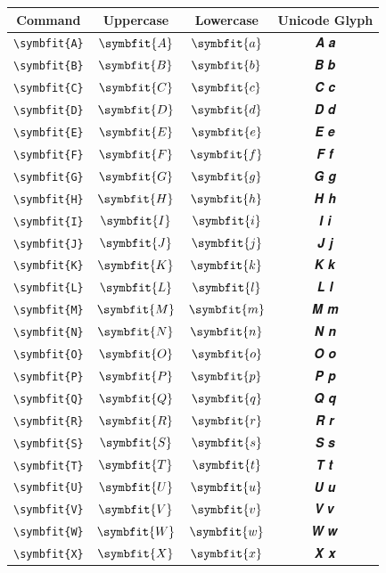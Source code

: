 \documentclass[12pt,a4paper]{article}
\begin{document}
\begin{longtable}{|c|c|c|c|}
\hline
\textbf{Command} & \textbf{Uppercase} & \textbf{Lowercase} & \textbf{Unicode Glyph} \\
\hline
\verb|\symbfit{A}| & $\symbfit{A}$ & $\symbfit{a}$ & 𝑨 𝒂 \\
\verb|\symbfit{B}| & $\symbfit{B}$ & $\symbfit{b}$ & 𝑩 𝒃 \\
\verb|\symbfit{C}| & $\symbfit{C}$ & $\symbfit{c}$ & 𝑪 𝒄 \\
\verb|\symbfit{D}| & $\symbfit{D}$ & $\symbfit{d}$ & 𝑫 𝒅 \\
\verb|\symbfit{E}| & $\symbfit{E}$ & $\symbfit{e}$ & 𝑬 𝒆 \\
\verb|\symbfit{F}| & $\symbfit{F}$ & $\symbfit{f}$ & 𝑭 𝒇 \\
\verb|\symbfit{G}| & $\symbfit{G}$ & $\symbfit{g}$ & 𝑮 𝒈 \\
\verb|\symbfit{H}| & $\symbfit{H}$ & $\symbfit{h}$ & 𝑯 𝒉 \\
\verb|\symbfit{I}| & $\symbfit{I}$ & $\symbfit{i}$ & 𝑰 𝒊 \\
\verb|\symbfit{J}| & $\symbfit{J}$ & $\symbfit{j}$ & 𝑱 𝒋 \\
\verb|\symbfit{K}| & $\symbfit{K}$ & $\symbfit{k}$ & 𝑲 𝒌 \\
\verb|\symbfit{L}| & $\symbfit{L}$ & $\symbfit{l}$ & 𝑳 𝒍 \\
\verb|\symbfit{M}| & $\symbfit{M}$ & $\symbfit{m}$ & 𝑴 𝒎 \\
\verb|\symbfit{N}| & $\symbfit{N}$ & $\symbfit{n}$ & 𝑵 𝒏 \\
\verb|\symbfit{O}| & $\symbfit{O}$ & $\symbfit{o}$ & 𝑶 𝒐 \\
\verb|\symbfit{P}| & $\symbfit{P}$ & $\symbfit{p}$ & 𝑷 𝒑 \\
\verb|\symbfit{Q}| & $\symbfit{Q}$ & $\symbfit{q}$ & 𝑸 𝒒 \\
\verb|\symbfit{R}| & $\symbfit{R}$ & $\symbfit{r}$ & 𝑹 𝒓 \\
\verb|\symbfit{S}| & $\symbfit{S}$ & $\symbfit{s}$ & 𝑺 𝒔 \\
\verb|\symbfit{T}| & $\symbfit{T}$ & $\symbfit{t}$ & 𝑻 𝒕 \\
\verb|\symbfit{U}| & $\symbfit{U}$ & $\symbfit{u}$ & 𝑼 𝒖 \\
\verb|\symbfit{V}| & $\symbfit{V}$ & $\symbfit{v}$ & 𝑽 𝒗 \\
\verb|\symbfit{W}| & $\symbfit{W}$ & $\symbfit{w}$ & 𝑾 𝒘 \\
\verb|\symbfit{X}| & $\symbfit{X}$ & $\symbfit{x}$ & 𝑿 𝒙 \\

\end{longtable}
\end{document}
